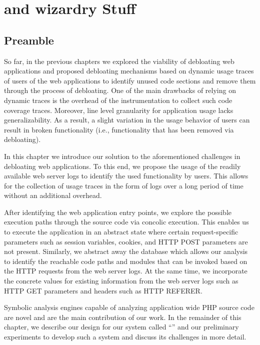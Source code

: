 \chapter{\sys{} and wizardry Stuff}

\section*{Preamble}

So far, in the previous chapters we explored the viability of debloating web applications and proposed debloating mechanisms based on dynamic usage traces of users of the web applications to identify unused code sections and remove them through the process of debloating. 
One of the main drawbacks of relying on dynamic traces is the overhead of the instrumentation to collect such code coverage traces. 
Moreover, line level granularity for application usage lacks generalizability. 
As a result, a slight variation in the usage behavior of users can result in broken functionality (i.e., functionality that has been removed via debloating). 

In this chapter we introduce our solution to the aforementioned challenges in debloating web applications. 
To this end, we propose the usage of the readily available web server logs to identify the used functionality by users. 
This allows for the collection of usage traces in the form of logs over a long period of time without an additional overhead. 

After identifying the web application entry points, we explore the possible execution paths through the source code via concolic execution. 
This enables us to execute the application in an abstract state where certain request-specific parameters such as session variables, cookies, and HTTP POST parameters are not present. 
Similarly, we abstract away the database which allows our analysis to identify the reachable code paths and modules that can be invoked based on the HTTP requests from the web server logs. 
At the same time, we incorporate the concrete values for existing information from the web server logs such as HTTP GET parameters and headers such as HTTP REFERER. 

Symbolic analysis engines capable of analyzing application wide PHP source code are novel and are the main contribution of our work. 
In the remainder of this chapter, we describe our design for our system called ``\sys{}'' and our preliminary experiments to develop such a system and discuss its challenges in more detail. 

